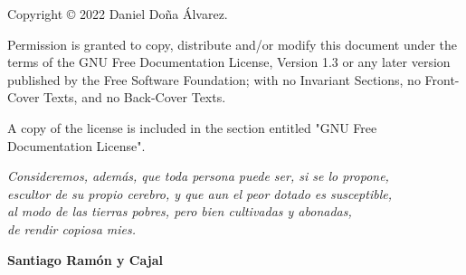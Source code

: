 \thispagestyle{empty}


Copyright © 2022 Daniel Doña Álvarez.

Permission is granted to copy, distribute and/or modify this document under the terms of the GNU Free Documentation License, Version 1.3 or any later version published by the Free Software Foundation; with no Invariant Sections, no Front-Cover Texts, and no Back-Cover Texts. 


A copy of the license is included in the section entitled "GNU Free Documentation License".

\restoregeometry
\newpage
\thispagestyle{empty}
\vspace{8cm}
\begin{flushleft}

\textit{Consideremos, además, que toda persona puede ser, si se lo propone, \\
escultor de su propio cerebro, y que aun el peor dotado es susceptible,\\
al modo de las tierras pobres, pero bien cultivadas y abonadas, \\
de rendir copiosa mies.\\}
\end{flushleft}
\begin{flushright}
\vspace{0.5cm}
\textbf{Santiago Ramón y Cajal}
\end{flushright}

\restoregeometry
\newpage
